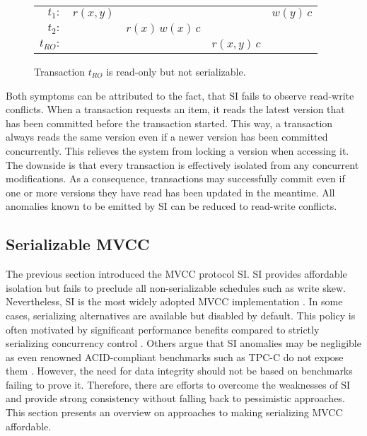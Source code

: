 \begin{figure}[h!]
    \centering
    \begin{tabular}{r c c c c}
    $t_1:$    & $r(x,y)$ &                   &              & $w(y)\, c$ \\
    $t_2:$    &          & $r(x)\, w(x)\, c$ &              &            \\
    $t_{RO}:$ &          &                   & $r(x,y)\, c$ &
    \end{tabular}
    \caption{Transaction $t_{RO}$ is read-only but not serializable.}
    \label{fig:bad_read_only}
\end{figure}

Both symptoms can be attributed to the fact, that SI fails to observe read-write
conflicts. When a transaction requests an item, it reads the latest version that
has been committed before the transaction started. This way, a transaction
always reads the same version even if a newer version has been committed
concurrently. This relieves the system from locking a version when accessing it.
The downside is that every transaction is effectively isolated from any
concurrent modifications. As a consequence, transactions may successfully commit
even if one or more versions they have read has been updated in the meantime.
All anomalies known to be emitted by SI can be reduced to read-write conflicts.

\subsection{Serializable MVCC}

The previous section introduced the MVCC protocol SI. SI provides affordable
isolation but fails to preclude all non-serializable schedules such as write
skew. Nevertheless, SI is the most widely adopted MVCC implementation
\cite{larson2011high, bailey2013exploring, neumann2015fast}. In some cases,
serializing alternatives are available but disabled by default. This policy is
often motivated by significant performance benefits compared to strictly
serializing concurrency control \cite{cahill2009serializable}. Others argue that
SI anomalies may be negligible as even renowned ACID-compliant benchmarks such
as TPC-C do not expose them \cite{fekete2005making}. However, the need for data
integrity should not be based on benchmarks failing to prove it. Therefore,
there are efforts to overcome the weaknesses of SI and provide strong
consistency without falling back to pessimistic approaches. This section
presents an overview on approaches to making serializing MVCC affordable.

